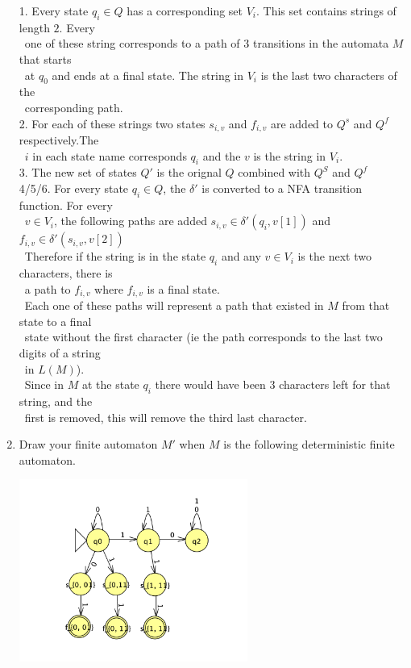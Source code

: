 \documentclass[11pt]{article}
\begin{document}
\begin{enumerate}
\begin{solution}
1. Every state $q_i\in Q$ has a corresponding set $V_i$. This set contains strings of length $2$. Every \\
\null\quad \ one of these string corresponds to a path of $3$ transitions in the automata $M$ that starts \\
\null\quad \ at $q_0$ and ends at a final state. The string in $V_i$ is the last two characters of the \\
\null\quad \ corresponding path.\\
2. For each of these strings two states $s_{i, v}$ and $f_{i, v}$ are added to $Q^s$ and $Q^f$ respectively.The \\
\null\quad \ $i$ in each state name corresponds $q_i$ and the $v$ is the string in $V_i$.\\
3. The new set of states $Q'$ is the orignal $Q$ combined with $Q^S$ and $Q^f$\\
4/5/6. For every state $q_i\in Q$, the $\delta'$ is converted to a NFA transition function. For every \\
\null\quad \ $v\in V_i$, the following paths are added $s_{i,v }\in\delta'(q_i, v[1])$ and $f_{i,v}\in\delta'(s_{i,v}, v[2])$\\
\null\quad \ Therefore if the string is in the state $q_i$ and any $v\in V_i$ is the next two characters, there is\\
\null\quad \ a path to $f_{i, v}$ where $f_{i,v}$ is a final state.\\
\null\quad \ Each one of these paths will represent a path that existed in $M$ from that state to a final \\
\null\quad \ state without the first character (ie the path corresponds to the last two digits of a string \\
\null\quad \ in $L(M)$).\\
\null\quad \ Since in $M$ at the state $q_i$ there would have been $3$ characters left for that string, and the \\
\null\quad \ first is removed, this will remove the third last character.
\end{solution}

\item
\begin{question}
Draw your finite automaton $M'$ when $M$ is the following deterministic finite automaton.
\end{question}

\begin{solution}
\includegraphics[width=75mm,scale=0.1]{a10.png}


\end{solution}
\end{enumerate}
\end{document}
